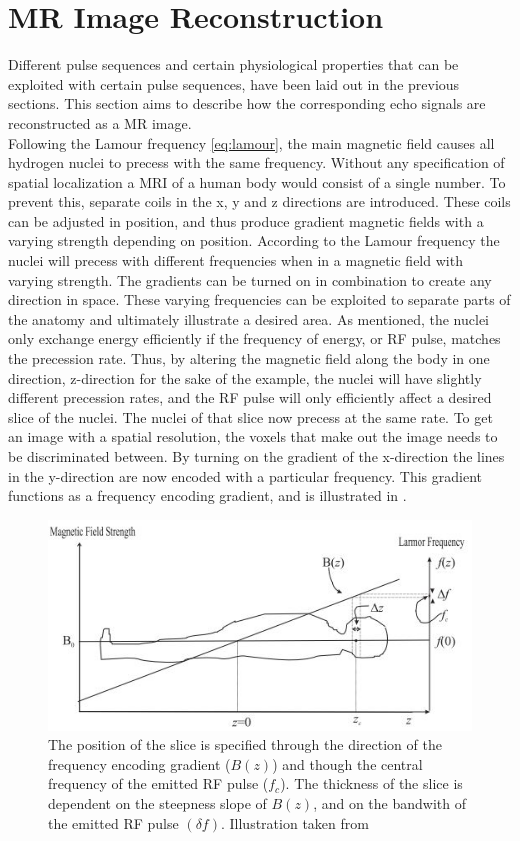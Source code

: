 \section{MR Image Reconstruction}\label{sec:IMrec}

Different pulse sequences and certain physiological properties that can be exploited with certain pulse sequences, have been laid out in the previous sections. This section aims to describe how the corresponding echo signals are reconstructed as a MR image.\\
Following the Lamour frequency \eqref{eq:lamour}, the main magnetic field causes all hydrogen nuclei to precess with the same frequency. Without any specification of spatial localization a MRI of a human body would consist of a single number. To prevent this, separate coils in the x, y and z directions are introduced. These coils can be adjusted in position, and thus produce gradient magnetic fields with a varying strength depending on position. According to the Lamour frequency the nuclei will precess with different frequencies when in a magnetic field with varying strength. The gradients can be turned on in combination to create any direction in space. These varying frequencies can be exploited to separate parts of the anatomy and ultimately illustrate a desired area. As mentioned, the nuclei only exchange energy efficiently if the frequency of energy, or RF pulse, matches the precession rate. Thus, by altering the magnetic field along the body in one direction, z-direction for the sake of the example, the nuclei will have slightly different precession rates, and the RF pulse will only efficiently affect a desired slice of the nuclei.
The nuclei of that slice now precess at the same rate. To get an image with a spatial resolution, the voxels that make out the image needs to be discriminated between. By turning on the gradient of the x-direction the lines in the y-direction are now encoded with a particular frequency. This gradient functions as a frequency encoding gradient, and is illustrated in . \cite{Bharath2008} \\
 \begin{figure}[H]                 
	\includegraphics[width=.7\textwidth]{figures/aBackground/gradient}  
	\caption{The position of the slice is specified through the direction of the frequency encoding gradient ($B(z)$) and though the central frequency of the emitted RF pulse ($f_c$). The thickness of the slice is dependent on the steepness slope of $B(z)$, and on the bandwith of the emitted RF pulse $(\delta f)$. Illustration taken from \cite{Bharath2008}}
	\label{fig:back:gradient} 
\end{figure} 

